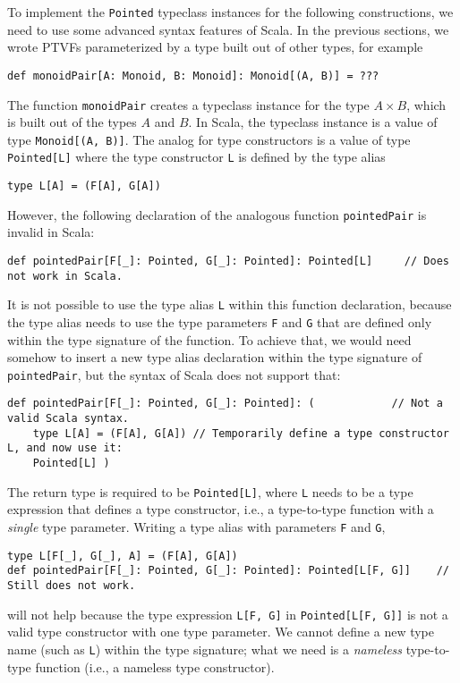 To implement the \lstinline!Pointed! typeclass instances for the
following constructions, we need to use some advanced syntax features
of Scala. In the previous sections, we wrote PTVFs parameterized by
a type built out of other types, for example
\begin{lstlisting}
def monoidPair[A: Monoid, B: Monoid]: Monoid[(A, B)] = ???
\end{lstlisting}
The function \lstinline!monoidPair! creates a typeclass instance
for the type $A\times B$, which is built out of the types $A$ and
$B$. In Scala, the typeclass instance is a value of type \lstinline!Monoid[(A, B)]!.
The analog for type constructors is a value of type \lstinline!Pointed[L]!
where the type constructor \lstinline!L! is defined by the type alias
\begin{lstlisting}
type L[A] = (F[A], G[A])
\end{lstlisting}
However, the following declaration of the analogous function \lstinline!pointedPair!
is invalid in Scala:
\begin{lstlisting}
def pointedPair[F[_]: Pointed, G[_]: Pointed]: Pointed[L]     // Does not work in Scala.
\end{lstlisting}
It is not possible to use the type alias \lstinline!L! within this
function declaration, because the type alias needs to use the type
parameters \lstinline!F! and \lstinline!G! that are defined only
within the type signature of the function. To achieve that, we would
need somehow to insert a new type alias declaration within the type
signature of \lstinline!pointedPair!, but the syntax of Scala does
not support that:
\begin{lstlisting}
def pointedPair[F[_]: Pointed, G[_]: Pointed]: (            // Not a valid Scala syntax.
    type L[A] = (F[A], G[A]) // Temporarily define a type constructor L, and now use it:
    Pointed[L] )
\end{lstlisting}
The return type is required to be \lstinline!Pointed[L]!, where \lstinline!L!
needs to be a type expression that defines a type constructor, i.e.,
a type-to-type function with a \emph{single} type parameter. Writing
a type alias with parameters \lstinline!F! and \lstinline!G!,
\begin{lstlisting}
type L[F[_], G[_], A] = (F[A], G[A])
def pointedPair[F[_]: Pointed, G[_]: Pointed]: Pointed[L[F, G]]    // Still does not work.
\end{lstlisting}
will not help because the type expression \lstinline!L[F, G]! in
\lstinline!Pointed[L[F, G]]! is not a valid type constructor with
one type parameter. We cannot define a new type name (such as \lstinline!L!)
within the type signature; what we need is a \emph{nameless} type-to-type
function (i.e., a nameless type constructor).

